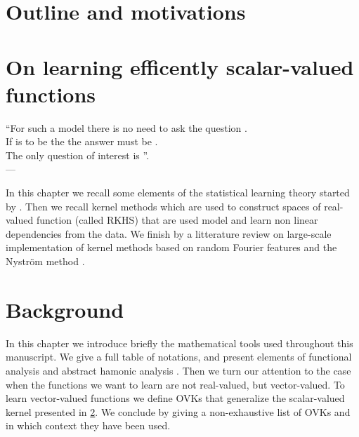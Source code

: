 \chapter{Outline and motivations}
\label{ch:motivations}


\chapter{On learning efficently scalar-valued functions}
\label{ch:motivations}
\bigskip
\begin{flushright}
    ``For such a model there is no need to ask the question . \\
    If  is to be the  the answer must
    be . \\
    The only question of interest is ''. \\
    --- 
    \citep{box1979robustness}
\end{flushright}
\bigskip
\begin{justify}
    In this chapter we recall some elements of the statistical learning theory
    started by \citet{Vapnik1998}.  Then we recall kernel methods
    \citep{Aronszajn1950} which are used to construct spaces of real-valued
    function (called RKHS) that are used model and learn non linear
    dependencies from the data. We finish by a litterature review on
    large-scale implementation of kernel methods based on random Fourier
    features \citep{Rahimi2007} and the Nystr\"om method
    \citep{Williams2000-nystrom}.
\end{justify}
\minitoc


\chapter{Background}
\label{ch:background}
\bigskip
\begin{justify}
    In this chapter we introduce briefly the mathematical tools used throughout
    this manuscript. We give a full table of notations, and present elements of
    functional analysis \citep{kurdila2006convex} and abstract hamonic analysis
    \citep{folland1994course}. Then we turn our attention to the case when the
    functions we want to learn are not real-valued, but vector-valued.  To
    learn vector-valued functions we define \aclp{OVK} that generalize the
    scalar-valued kernel presented in \cref{ch:motivations}. We conclude by
    giving a non-exhaustive list of \aclp{OVK} and in which context they have
    been used.
\end{justify}
\minitoc

